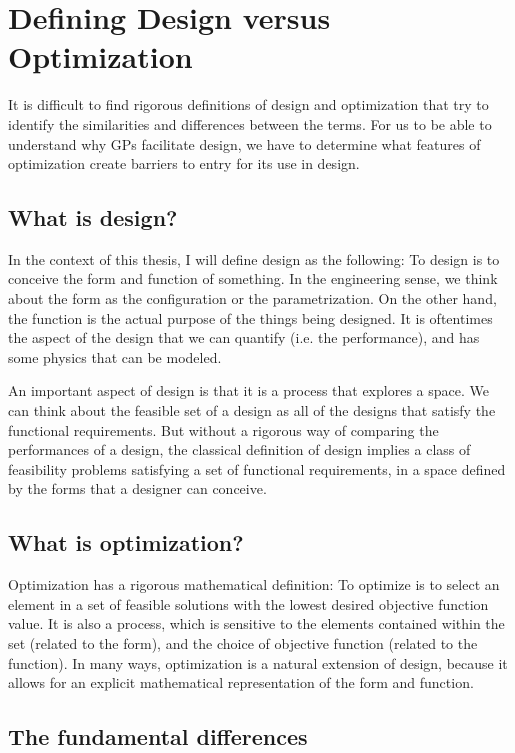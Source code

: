 \section{Defining Design versus Optimization} \label{s:DesVsOpt}

It is difficult to find rigorous definitions of design and optimization that
try to identify the similarities and differences between the terms. For us to be
able to understand why \gls{GP}s facilitate design, we have to determine what 
features of optimization create barriers to entry for its use in design. 

\subsection{What is design?}

In the context of this thesis, I will define design as the following:
To design is to conceive the form and function of something.
In the engineering sense, we think about the form as the configuration or
the parametrization. On the other hand, the function is the actual purpose of the things
being designed. It is oftentimes the aspect of the design that we can
quantify (i.e. the performance), and has some physics that can be modeled.

An important aspect of design is that it is a process that explores a space.
We can think about the feasible set of a design as all of the designs
that satisfy the functional requirements. But without a rigorous way of comparing
the performances of a design, the classical
definition of design implies a class of feasibility problems satisfying a set of
functional requirements, in a space defined by
the forms that a designer can conceive.

\subsection{What is optimization?}

Optimization has a rigorous mathematical definition: To optimize is to select an 
element in a set of feasible solutions with the lowest desired objective
function value. It is also a process, which is sensitive to the elements contained within the set
(related to the form), and the choice of objective function (related to the 
function). In many ways, optimization is a natural extension of design, because it allows
for an explicit mathematical representation of the form and function.

\subsection{The fundamental differences}

